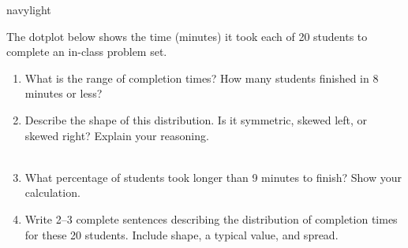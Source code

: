 \documentclass[10pt]{article}
\begin{document}
\begin{blurbbox}{navylight}
\small

The dotplot below shows the time (minutes) it took each of 20 students to
complete an in-class problem set.

\vspace{0.12in}

\begin{center}
\end{center}

\vspace{0.12in}

\begin{enumerate}[leftmargin=1.5em, itemsep=8pt]

  \item What is the range of completion times? \blank{3cm}
        How many students finished in 8 minutes or less?
        \blank{2.5cm}

  \item Describe the shape of this distribution. Is it symmetric, skewed left,
        or skewed right? Explain your reasoning.\\[6pt]
        \writeline\\[1pt]\writeline

  \item What percentage of students took longer than 9 minutes to finish?
        Show your calculation.\\[6pt]
        \writeline

  \item Write 2--3 complete sentences describing the distribution of completion
        times for these 20 students. Include shape, a typical value, and spread.\\[6pt]
        \writeline\\[1pt]\writeline\\[1pt]\writeline

\end{enumerate}

\end{blurbbox}
\end{document}

